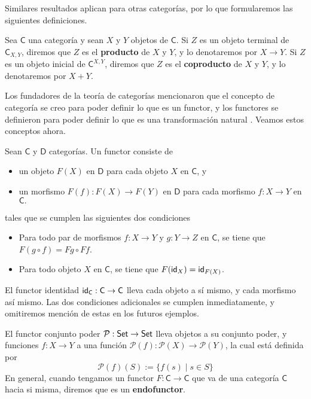 \documentclass[../main.tex]{subfiles}
\begin{document}
Similares resultados aplican para otras categor\'ias, por lo que formularemos las siguientes definiciones.

\begin{definitionap}
    Sea $\mathsf{C}$ una categor\'ia y sean $X$ y $Y$ objetos de $\mathsf{C}$.
    Si $Z$ es un objeto terminal de $\mathsf{C}_{X,Y}$, diremos que $Z$ es el \textbf{producto} de $X$ y $Y$, y lo denotaremos por $X \to Y$.
    Si $Z$ es un objeto inicial de $\mathsf{C}^{X,Y}$, diremos que $Z$ es el \textbf{coproducto} de $X$ y $Y$, y lo denotaremos por $X + Y$.
\end{definitionap}

Los fundadores de la teor\'ia de categor\'ias mencionaron que el concepto de categor\'ia se creo para poder definir lo que es un functor, y los functores se definieron para poder definir lo que es una transformaci\'on natural \cite{mac_lane_categories_2010}. Veamos estos conceptos ahora.

\begin{definitionap}
    Sean $\mathsf{C}$ y $\mathsf{D}$ categor\'ias. Un functor consiste de
    \begin{itemize}
        \item un objeto $F(X)$ en $\mathsf{D}$ para cada objeto $X$ en $\mathsf{C}$, y
        \item un morfismo $F(f):F(X) \to F(Y)$ en $\mathsf{D}$ para cada morfismo $f:X \to Y$ en $\mathsf{C}.$
    \end{itemize}
    tales que se cumplen las siguientes dos condiciones
    \begin{itemize}
        \item Para todo par de morfismos $f: X \to Y$ y $g: Y \to Z$ en $\mathsf{C}$, se tiene que $F(g \circ f) = F g \circ F f$.
        \item Para todo objeto $X$ en $\mathsf{C}$, se tiene que $F(\idfunc[X])=\idfunc[F(X)]$.
    \end{itemize}
\end{definitionap}

\begin{exampleap}
    El functor identidad $\idfunc[\mathsf{C}]:\mathsf{C} \to\mathsf{C}$ lleva cada objeto a s\'i mismo, y cada morfismo as\'i mismo. Las dos condiciones adicionales se cumplen inmediatamente, y omitiremos menci\'on de estas en los futuros ejemplos.
\end{exampleap}

\begin{exampleap}
    El functor conjunto poder $\mathcal{P}:\set \to \set$ lleva objetos a su conjunto poder, y funciones $f:X \to Y$ a una funci\'on $\mathcal{P}(f):\mathcal{P}(X) \to \mathcal{P}(Y)$, la cual est\'a definida por
    \[ \mathcal{P}(f)(S) := \{ f(s) \mid s \in S \} \]
    En general, cuando tengamos un functor $F: \mathsf{C} \to \mathsf{C}$ que va de una categor\'ia $\mathsf{C}$ hacia si misma, diremos que es un \textbf{endofunctor}.
\end{exampleap}
\end{document}
